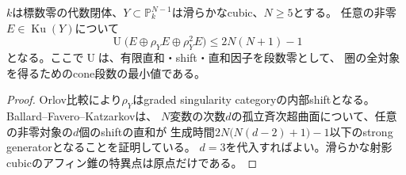 \begin{proposition}
\label{gcd:prop:bound}
$k$は標数零の代数閉体、$Y\subset\mathbb P^{N-1}_k$は滑らかなcubic、$N\ge5$とする。
任意の非零$E\in\operatorname{Ku}(Y)$について
\begin{equation}\label{gcd:eq:bound}
 \operatorname U\bigl(E\oplus\rho_YE\oplus\rho_Y^2E\bigr)
 \le 2N(N+1)-1
\end{equation}
となる。ここで$\operatorname U$は、有限直和・shift・直和因子を段数零として、
圏の全対象を得るためのcone段数の最小値である。
\end{proposition}
\begin{proof}
Orlov比較により$\rho_Y$はgraded singularity categoryの内部shiftとなる。
Ballard--Favero--Katzarkov\cite[Theorem~5.15]{GCDBFK}は、
$N$変数の次数$d$の孤立斉次超曲面について、任意の非零対象の$d$個のshiftの直和が
生成時間$2N\bigl(N(d-2)+1\bigr)-1$以下のstrong generatorとなることを証明している。
$d=3$を代入すればよい。滑らかな射影cubicのアフィン錐の特異点は原点だけである。
\end{proof}
